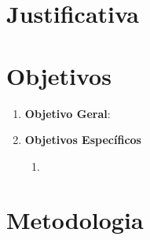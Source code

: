 \section*{Justificativa}

\section*{Objetivos}

\begin{enumerate}
	\item \textbf{Objetivo Geral}:

	\item \textbf{Objetivos Específicos}
	\begin{enumerate}
		\item 
	\end{enumerate}
\end{enumerate}

\section*{Metodologia}
